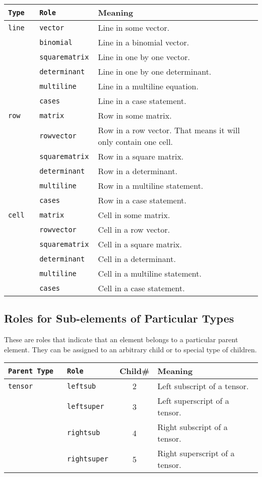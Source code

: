 \documentclass{article}
\begin{document}
\begin{tabular}{>{\tt}l>{\tt}lp{11cm}}
  Type & Role & Meaning\\\hline
  line & vector & Line in some vector.\\
       & binomial & Line in a binomial vector.\\
       & squarematrix & Line in one by one vector.\\
       & determinant & Line in one by one determinant.\\
       & multiline & Line in a multiline equation.\\
       & cases & Line in a case statement.\\
  row & matrix & Row in some matrix.\\
       & rowvector & Row in a row vector. That means it will only contain one cell.\\
       & squarematrix & Row in a square matrix.\\
       & determinant & Row in a determinant.\\
       & multiline & Row in a multiline statement.\\
       & cases & Row in a case statement.\\
  cell & matrix & Cell in some matrix.\\
       & rowvector & Cell in a row vector.\\
       & squarematrix & Cell in a square matrix.\\
       & determinant & Cell in a determinant.\\
       & multiline & Cell in a multiline statement.\\
       & cases & Cell in a case statement.\\
\end{tabular}


\subsection{Roles for Sub-elements of Particular Types}

These are roles that indicate that an element belongs to a particular parent
element. They can be assigned to an arbitrary child or to special type of
children.

\noindent\begin{tabular}{>{\tt}l>{\tt}lcp{9.5cm}}
  Parent Type & Role & Child\# & Meaning\\\hline
  tensor      & leftsub & 2 & Left subscript of a tensor. \\
              & leftsuper & 3 & Left superscript of a tensor. \\
              & rightsub & 4 &Right subscript of a tensor. \\
              & rightsuper & 5 & Right superscript of a tensor. \\
\end{tabular}
\end{document}
